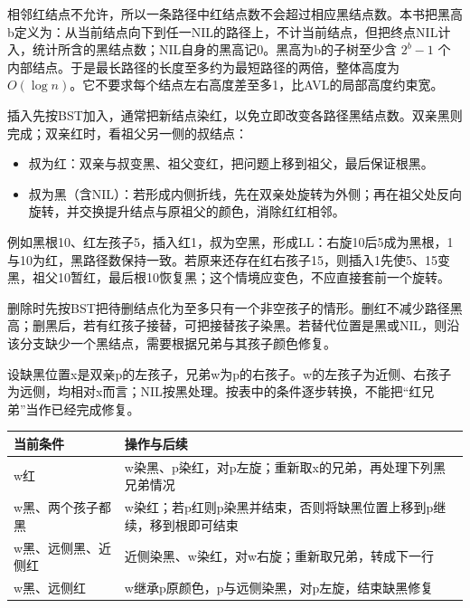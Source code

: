 相邻红结点不允许，所以一条路径中红结点数不会超过相应黑结点数。本书把黑高b定义为：从当前结点向下到任一NIL的路径上，不计当前结点，但把终点NIL计入，统计所含的黑结点数；NIL自身的黑高记0。黑高为b的子树至少含 \(2^b-1\) 个内部结点。于是最长路径的长度至多约为最短路径的两倍，整体高度为 \(O(\log n)\)。它不要求每个结点左右高度差至多1，比AVL的局部高度约束宽。

插入先按BST加入，通常把新结点染红，以免立即改变各路径黑结点数。双亲黑则完成；双亲红时，看祖父另一侧的叔结点：

\begin{itemize}
\tightlist
\item
  叔为红：双亲与叔变黑、祖父变红，把问题上移到祖父，最后保证根黑。
\item
  叔为黑（含NIL）：若形成内侧折线，先在双亲处旋转为外侧；再在祖父处反向旋转，并交换提升结点与原祖父的颜色，消除红红相邻。
\end{itemize}

例如黑根10、红左孩子5，插入红1，叔为空黑，形成LL：右旋10后5成为黑根，1与10为红，黑路径数保持一致。若原来还存在红右孩子15，则插入1先使5、15变黑，祖父10暂红，最后根10恢复黑；这个情境应变色，不应直接套前一个旋转。

删除时先按BST把待删结点化为至多只有一个非空孩子的情形。删红不减少路径黑高；删黑后，若有红孩子接替，可把接替孩子染黑。若替代位置是黑或NIL，则沿该分支缺少一个黑结点，需要根据兄弟与其孩子颜色修复。

设缺黑位置x是双亲p的左孩子，兄弟w为p的右孩子。w的左孩子为近侧、右孩子为远侧，均相对x而言；NIL按黑处理。按表中的条件逐步转换，不能把``红兄弟''当作已经完成修复。

\begin{wideblock}

\par\medskip\noindent\begin{minipage}{\linewidth}\fontsize{9.3}{12}\selectfont\begin{tabularx}{\linewidth}{@{}YY@{}}
\toprule\noalign{}
\begin{minipage}[b]{\linewidth}\raggedright
当前条件
\end{minipage} & \begin{minipage}[b]{\linewidth}\raggedright
操作与后续
\end{minipage} \\
\midrule\noalign{}


w红 & w染黑、p染红，对p左旋；重新取x的兄弟，再处理下列黑兄弟情况 \\
w黑、两个孩子都黑 & w染红；若p红则p染黑并结束，否则将缺黑位置上移到p继续，移到根即可结束 \\
w黑、远侧黑、近侧红 & 近侧染黑、w染红，对w右旋；重新取兄弟，转成下一行 \\
w黑、远侧红 & w继承p原颜色，p与远侧染黑，对p左旋，结束缺黑修复 \\
\bottomrule\end{tabularx}
\end{minipage}\par\medskip

\end{wideblock}

